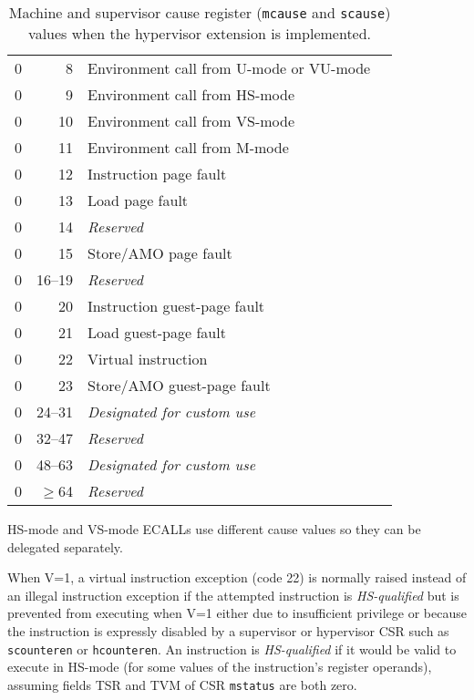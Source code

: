 \begin{table*}[p]
\begin{center}
\begin{tabular}{|r|r|l|l|}
  0         & 8               & Environment call from U-mode or VU-mode \\
  0         & 9               & Environment call from HS-mode \\
  0         & 10              & Environment call from VS-mode \\
  0         & 11              & Environment call from M-mode \\
  0         & 12              & Instruction page fault \\
  0         & 13              & Load page fault \\
  0         & 14              & {\em Reserved} \\
  0         & 15              & Store/AMO page fault \\
  0         & 16--19          & {\em Reserved} \\
  0         & 20              & Instruction guest-page fault \\
  0         & 21              & Load guest-page fault \\
  0         & 22              & Virtual instruction \\
  0         & 23              & Store/AMO guest-page fault \\
  0         & 24--31          & {\em Designated for custom use} \\
  0         & 32--47          & {\em Reserved} \\
  0         & 48--63          & {\em Designated for custom use} \\
  0         & $\ge$64         & {\em Reserved} \\
  \hline
\end{tabular}
\end{center}
\caption{Machine and supervisor cause register ({\tt mcause} and
{\tt scause}) values when the hypervisor extension is implemented.}
\label{hcauses}
\end{table*}

\begin{commentary}
HS-mode and VS-mode ECALLs use different cause values so they can be delegated
separately.
\end{commentary}

When V=1, a virtual instruction exception (code 22) is normally
raised instead of an illegal instruction exception if the attempted
instruction is \textit{HS-qualified}
but is prevented from executing when V=1 either due to
insufficient privilege or because the instruction is expressly disabled
by a supervisor or hypervisor CSR such as {\tt scounteren} or {\tt hcounteren}.
An instruction is \textit{HS-qualified} if it would be valid to execute
in HS-mode (for some values of the instruction's register operands),
assuming fields TSR and TVM of CSR {\tt mstatus} are both zero.

